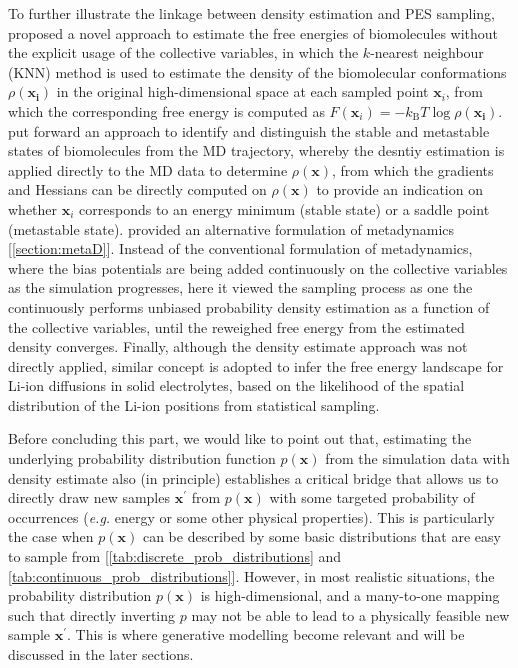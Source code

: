 To further illustrate the linkage between density estimation and PES sampling, \citet{rodriguez2018computing} proposed a novel approach to estimate the free energies of biomolecules without the explicit usage of the collective variables, in which the $k$-nearest neighbour (KNN) method is used to estimate the density of the biomolecular conformations $\rho(\bm{x_i})$ in the original high-dimensional space at each sampled point $\bm{x}_i$, from which the corresponding free energy is computed as  $F(\bm{x}_i)=-k_{\mathrm{B}}T\log \rho(\bm{x_i})$. \citet{westerlund2019inflecs} put forward an approach to identify and distinguish the stable and metastable states of biomolecules from the MD trajectory, whereby the desntiy estimation is applied directly to the MD data to determine $\rho(\bm{x})$, from which the gradients and Hessians can be directly computed on $\rho(\bm{x})$ to provide an indication on whether $\bm{x}_i$ corresponds to an energy minimum (stable state) or a saddle point (metastable state). \citet{invernizzi2020rethinking} provided an alternative formulation of metadynamics [\cref{section:metaD}]. Instead of the conventional formulation of metadynamics, where the bias potentials are being added continuously on the collective variables as the simulation progresses, here it viewed the sampling process as one the continuously performs unbiased probability density estimation as a function of the collective variables, until the reweighed free energy from the estimated density converges. Finally, although the density estimate approach was not directly applied, similar concept is adopted to infer the free energy landscape for Li-ion diffusions in solid electrolytes,\cite{gustafsson2023predicting} based on the likelihood of the spatial distribution of the Li-ion positions from statistical sampling. 

Before concluding this part, we would like to point out that, estimating the underlying probability distribution  function $p(\bm{x})$ from the simulation data with density estimate also  (in principle) establishes a critical bridge that allows us to directly draw new samples $\bm{x}^\prime$ from $p(\bm{x})$ with  some targeted probability of occurrences (\textit{e.g.} energy or some other physical properties). This is particularly the case when $p(\bm{x})$ can be described by some basic distributions that are easy to sample from [\cref{tab:discrete_prob_distributions} and \cref{tab:continuous_prob_distributions}]. However, in most realistic situations, the probability distribution $p(\bm{x})$ is high-dimensional, and a many-to-one mapping such that directly inverting $p$ may not be able to lead to a physically feasible new sample $\bm{x}^\prime$. This is where generative modelling become relevant and will be discussed in the later sections.

